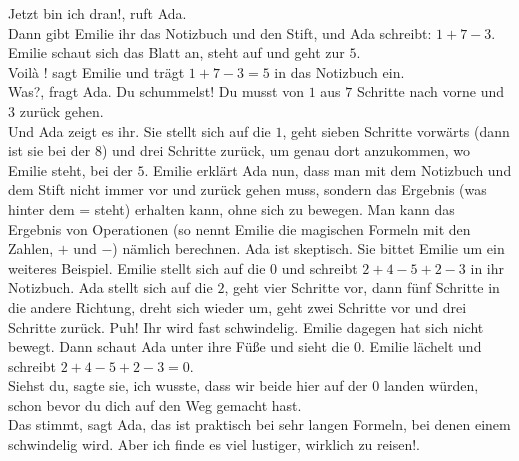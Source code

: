\frqq{}Jetzt bin ich dran!\flqq{}, ruft Ada.\\
Dann gibt Emilie ihr das Notizbuch und den Stift, und Ada schreibt: $1 + 7 - 3$. Emilie schaut sich das Blatt an, steht auf und geht zur $5$.\\
\frqq{}Voilà !\flqq{} sagt Emilie und trägt $1 + 7 - 3 = 5$ in das Notizbuch ein.\\
\frqq{}Was?\flqq{}, fragt Ada. \frqq{}Du schummelst! Du musst von $1$ aus $7$ Schritte nach vorne und $3$ zurück gehen.\flqq{}\\
Und Ada zeigt es ihr. Sie stellt sich auf die $1$, geht sieben Schritte vorwärts (dann ist sie bei der $8$) und drei Schritte zurück, um genau dort anzukommen, wo Emilie steht, bei der $5$. Emilie erklärt Ada nun, dass man mit dem Notizbuch und dem Stift nicht immer vor und zurück gehen muss, sondern das Ergebnis (was hinter dem = steht) erhalten kann, ohne sich zu bewegen. Man kann das Ergebnis von Operationen (so nennt Emilie die magischen Formeln mit den Zahlen, $+$ und $-$) nämlich berechnen. Ada ist skeptisch. Sie bittet Emilie um ein weiteres Beispiel. Emilie stellt sich auf die $0$ und schreibt $2 + 4 - 5 + 2 - 3$ in ihr Notizbuch. Ada stellt sich auf die $2$, geht vier Schritte vor, dann fünf Schritte in die andere Richtung, dreht sich wieder um, geht zwei Schritte vor und drei Schritte zurück. Puh! Ihr wird fast schwindelig. Emilie dagegen hat sich nicht bewegt. Dann schaut Ada unter ihre Füße und sieht die $0$. Emilie lächelt und schreibt $2 + 4 - 5 + 2 - 3 = 0$.\\
\frqq{}Siehst du\flqq{}, sagte sie, \frqq{}ich wusste, dass wir beide hier auf der $0$ landen würden, schon bevor du dich auf den Weg gemacht hast.\flqq{}\\
\frqq{}Das stimmt\flqq{}, sagt Ada, \frqq{}das ist praktisch bei sehr langen Formeln, bei denen einem schwindelig wird. Aber ich finde es viel lustiger, wirklich zu reisen!\flqq{}.
